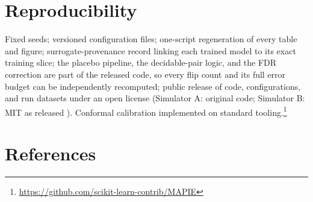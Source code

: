 \documentclass[12pt,a4paper]{article}
\begin{document}
\section{Reproducibility}

Fixed seeds; versioned configuration files; one-script regeneration of every table and figure; surrogate-provenance record linking each trained model to its exact training slice; the placebo pipeline, the decidable-pair logic, and the FDR correction are part of the released code, so every flip count and its full error budget can be independently recomputed; public release of code, configurations, and run datasets under an open license (Simulator A: original code; Simulator B: MIT as released \citep{zhang2026isomorph}). Conformal calibration implemented on standard tooling.\footnote{\url{https://github.com/scikit-learn-contrib/MAPIE}}

\section*{References}
\end{document}
